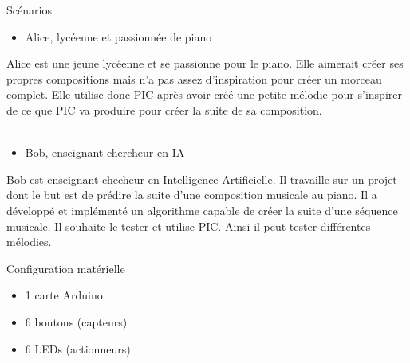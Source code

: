 \documentclass[11pt]{beamer}
\begin{document}
\begin{frame}{Scénarios}
\begin{itemize}
    \item Alice, lycéenne et passionnée de piano
\end{itemize}
Alice est une jeune lycéenne et se passionne pour le piano. Elle aimerait créer ses propres compositions mais n'a pas assez d'inspiration pour créer un morceau complet. Elle utilise donc PIC après avoir créé une petite mélodie pour s'inspirer de ce que PIC va produire pour créer la suite de sa composition.\\~\\

\begin{itemize}
    \item Bob, enseignant-chercheur en IA
\end{itemize}
Bob est enseignant-checheur en Intelligence Artificielle. Il travaille sur un projet dont le but est de prédire la suite d'une composition musicale au piano. Il a développé et implémenté un algorithme capable de créer la suite d'une séquence musicale. Il souhaite le tester et utilise PIC. Ainsi il peut tester différentes mélodies. 
    
\end{frame}

\begin{frame}{Configuration matérielle}
\begin{itemize}
    \item 1 carte Arduino
    \item 6 boutons (capteurs)
    \item 6 LEDs (actionneurs)
\end{itemize}
\end{frame}


\end{document}
